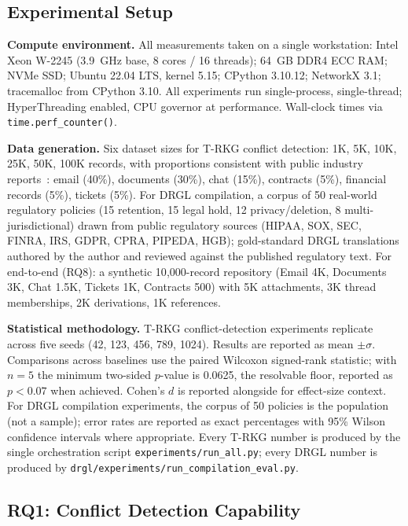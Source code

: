 \documentclass{ieeeaccess}
\begin{document}
\subsection{Experimental Setup}

\textbf{Compute environment.} All measurements taken on a single workstation: Intel Xeon W-2245 (3.9~GHz base, 8 cores / 16 threads); 64~GB DDR4 ECC RAM; NVMe SSD; Ubuntu 22.04 LTS, kernel 5.15; CPython 3.10.12; NetworkX 3.1; tracemalloc from CPython 3.10. All experiments run single-process, single-thread; HyperThreading enabled, CPU governor at performance. Wall-clock times via \texttt{time.perf\_counter()}.

\textbf{Data generation.} Six dataset sizes for T-RKG conflict detection: 1K, 5K, 10K, 25K, 50K, 100K records, with proportions consistent with public industry reports~\cite{databerg,igrm}: email (40\%), documents (30\%), chat (15\%), contracts (5\%), financial records (5\%), tickets (5\%). For DRGL compilation, a corpus of 50 real-world regulatory policies (15 retention, 15 legal hold, 12 privacy/deletion, 8 multi-jurisdictional) drawn from public regulatory sources (HIPAA, SOX, SEC, FINRA, IRS, GDPR, CPRA, PIPEDA, HGB); gold-standard DRGL translations authored by the author and reviewed against the published regulatory text. For end-to-end (RQ8): a synthetic 10{,}000-record repository (Email 4K, Documents 3K, Chat 1.5K, Tickets 1K, Contracts 500) with 5K attachments, 3K thread memberships, 2K derivations, 1K references.

\textbf{Statistical methodology.} T-RKG conflict-detection experiments replicate across five seeds (42, 123, 456, 789, 1024). Results are reported as mean $\pm \sigma$. Comparisons across baselines use the paired Wilcoxon signed-rank statistic; with $n=5$ the minimum two-sided $p$-value is 0.0625, the resolvable floor, reported as $p < 0.07$ when achieved. Cohen's $d$ is reported alongside for effect-size context. For DRGL compilation experiments, the corpus of 50 policies is the population (not a sample); error rates are reported as exact percentages with 95\% Wilson confidence intervals where appropriate. Every T-RKG number is produced by the single orchestration script \texttt{experiments/run\_all.py}; every DRGL number is produced by \texttt{drgl/experiments/run\_compilation\_eval.py}.

\subsection{RQ1: Conflict Detection Capability}
\label{sec:rq1}
\end{document}
